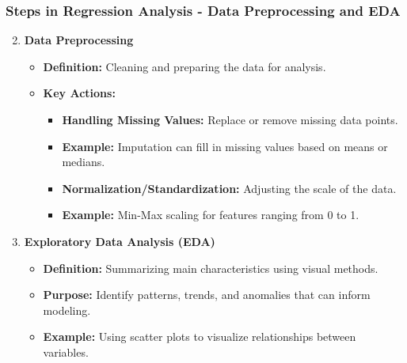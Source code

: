 \documentclass{beamer}
\begin{document}
\begin{frame}[fragile]
    \frametitle{Steps in Regression Analysis - Data Preprocessing and EDA}
    \begin{enumerate}
        \setcounter{enumi}{1}
        \item \textbf{Data Preprocessing}
        \begin{itemize}
            \item \textbf{Definition:} Cleaning and preparing the data for analysis.
            \item \textbf{Key Actions:}
                \begin{itemize}
                    \item \textbf{Handling Missing Values:} Replace or remove missing data points.
                    \item \textbf{Example:} Imputation can fill in missing values based on means or medians.
                    \item \textbf{Normalization/Standardization:} Adjusting the scale of the data.
                    \item \textbf{Example:} Min-Max scaling for features ranging from 0 to 1.
                \end{itemize}
        \end{itemize}
        
        \item \textbf{Exploratory Data Analysis (EDA)}
        \begin{itemize}
            \item \textbf{Definition:} Summarizing main characteristics using visual methods.
            \item \textbf{Purpose:} Identify patterns, trends, and anomalies that can inform modeling.
            \item \textbf{Example:} Using scatter plots to visualize relationships between variables.
        \end{itemize}
    \end{enumerate}
\end{frame}
\end{document}
